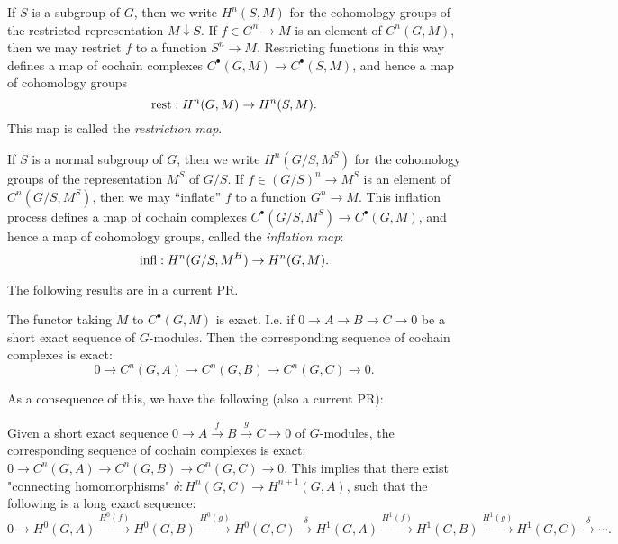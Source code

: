 \begin{definition} \label{def:restriction map}
	If $S$ is a subgroup of $G$, then we write $H^n(S,M)$ for the
	cohomology groups of the restricted representation $M \downarrow S$.
	If $f \in G^n \to M$ is an element of $C^n(G,M)$, then we may restrict $f$ to
	a function $S^n \to M$. Restricting functions in this way defines a map of
	cochain complexes $C^\bullet(G,M) \to C^\bullet(S,M)$, and hence a map of
	cohomology groups
	\[
		\mathrm{rest} : H^n(G,M) \to H^n(S,M).
	\]
	This map is called the \emph{restriction map}.
\end{definition}

\begin{definition} \label{def:inflation map}
	If $S$ is a normal subgroup of $G$, then we write $H^n(G/S,M^S)$ for the
	cohomology groups of the representation $M^S$ of $G/S$.
	If $f \in (G/S)^n \to M^S$ is an element of $C^n(G/S,M^S)$, then we may ``inflate'' $f$ to
	a function $G^n \to M$. This inflation process defines a map of
	cochain complexes $C^\bullet(G/S,M^S) \to C^\bullet(G,M)$, and hence a map of
	cohomology groups, called the \emph{inflation map}:
	\[
		\mathrm{infl} : H^n(G/S,M^H) \to H^n(G,M).
	\]
\end{definition}

The following results are in a current PR.

\begin{lemma} \label{lem:cochainsFunctor exact}
  The functor taking $M$ to $C^\bullet (G,M)$ is exact.
  I.e. if $0 \to A \to B \to C \to 0$ be a short exact sequence of $G$-modules.
  Then the corresponding sequence of cochain complexes is exact:
  \[
    0 \to C^n(G,A) \to C^n(G,B) \to C^n(G,C) \to 0.
  \]
\end{lemma}

As a consequence of this, we have the following (also a current PR):

\begin{definition} \label{def:cohomology long exact sequence}
  Given a short exact sequence $0 \to A \stackrel{f}\to B \stackrel{g}\to C \to 0$ of $G$-modules,
  the corresponding sequence of cochain complexes is exact:
  $0 \to C^n(G,A) \to C^n(G,B) \to C^n(G,C) \to 0$.
  This implies that there exist "connecting homomorphisms" $\delta : H^n(G,C) \to H^{n+1}(G,A)$,
  such that the following is a long exact sequence:
  \[
    0 \to H^0(G,A) \stackrel{H^0(f)}\to H^0(G,B) \stackrel{H^0(g)}\to H^0(G,C) \stackrel{\delta}\to
    H^1(G,A) \stackrel{H^1(f)}\to H^1(G,B) \stackrel{H^1(g)} \to H^1(G,C) \stackrel{\delta}\to \cdots.
  \]
\end{definition}

